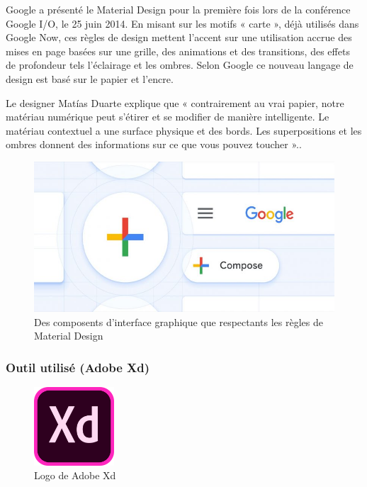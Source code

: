 Google a présenté le Material Design pour la première fois lors de la conférence Google I/O, le 25 juin 2014. En misant sur les motifs « carte », déjà utilisés dans Google Now, ces règles de design mettent l'accent sur une utilisation accrue des mises en page basées sur une grille, des animations et des transitions, des effets de profondeur tels l'éclairage et les ombres. Selon Google ce nouveau langage de design est basé sur le papier et l'encre.

Le designer Matías Duarte explique que « contrairement au vrai papier, notre matériau numérique peut s'étirer et se modifier de manière intelligente. Le matériau contextuel a une surface physique et des bords. Les superpositions et les ombres donnent des informations sur ce que vous pouvez toucher ».\cite{noauthor_material_2018}.

\begin{figure}[H]
	\centering
		\includegraphics[width=14cm]{Images/chapter3/material_design.jpg}
		\caption{{\footnotesize Des composents d'interface graphique que respectants les règles de Material Design}}
\end{figure}

\subsubsection{Outil utilisé (Adobe Xd)}

\begin{figure}
	\vspace{-10pt}
	\includegraphics[width=3cm]{Images/chapter3/adobe_xd_logo.png}
	\vspace{-10pt}
	\caption{{\footnotesize Logo de Adobe Xd}}
\end{figure}

